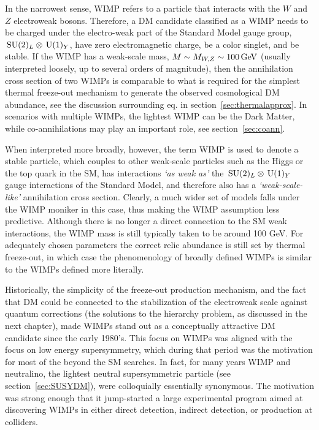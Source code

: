 In the narrowest sense, WIMP refers to a particle that interacts with the $W$ and $Z$ electroweak bosons.
Therefore, a DM candidate classified as a WIMP needs to be charged under the electro-weak part of the Standard Model gauge group, $\,{\rm SU}(2)_L\otimes \,{\rm U}(1)_Y$, 
have zero electromagnetic charge, be a color singlet, and be stable.
If the WIMP has a weak-scale mass, $M \sim M_{W,Z}\sim 100\,{\rm GeV}$
(usually interpreted loosely, up to several orders of magnitude), then 
the annihilation cross section of two WIMPs is comparable to what is required 
for the simplest thermal freeze-out mechanism to generate the observed cosmological DM abundance, 
see the discussion surrounding eq. in  section~\ref{sec:thermalapprox}.
In scenarios with multiple WIMPs, the lightest WIMP can be the Dark Matter, while
co-annihilations may play an important role, see section~\ref{sec:coann}.

\smallskip

When interpreted more broadly, however, 
the term WIMP is used to denote a stable particle, 
which couples to other weak-scale particles such as the Higgs or the top quark in the SM,
has interactions {\em `as weak as'} the $\,{\rm SU}(2)_L\otimes \,{\rm U}(1)_Y$ gauge interactions of the Standard Model, 
and therefore also has a {\em `weak-scale-like'} annihilation cross section. Clearly, a much wider set of models falls under the WIMP moniker in this case, thus making the WIMP assumption less predictive. 
Although there is no longer a direct connection to the SM weak interactions, the WIMP mass is still typically taken to be around 100 GeV.
For adequately chosen parameters the correct relic abundance is still set by thermal freeze-out, in which case the phenomenology of broadly defined WIMPs is 
similar to the WIMPs defined more literally. 

\medskip

Historically, the simplicity of the freeze-out production mechanism, and the fact that DM could be connected to the stabilization of the electroweak scale against quantum corrections (the solutions to the hierarchy problem, as discussed in the next chapter), made WIMPs stand out as a conceptually attractive DM candidate since the early 1980's. This focus on WIMPs was aligned with the focus on low energy supersymmetry, which during that period was the motivation for most of the beyond the SM searches. In fact, for many years WIMP and neutralino, the lightest neutral supersymmetric particle (see section~\ref{sec:SUSYDM}), were colloquially essentially synonymous. 
The motivation was strong enough that it jump-started a large experimental program aimed at discovering WIMPs in either direct detection, indirect detection, or production at colliders. 

